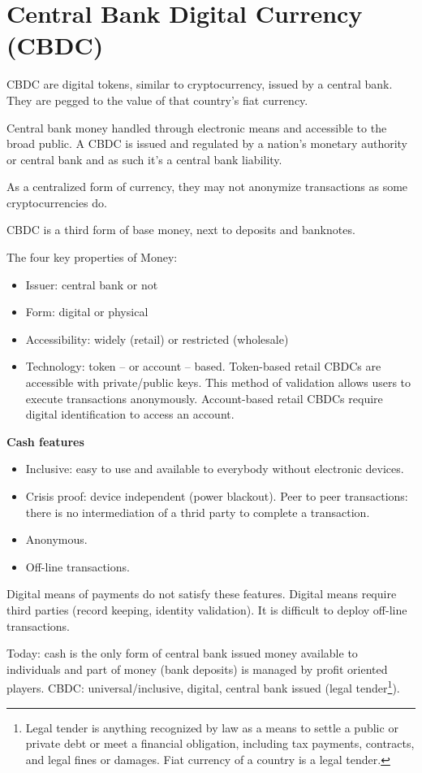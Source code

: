 \section{Central Bank Digital Currency (CBDC)}

CBDC are digital tokens, similar to cryptocurrency, issued by a central bank. They are pegged to the value of that country's fiat currency.

Central bank money handled through electronic means and accessible to the broad public. A CBDC is issued and regulated by a nation's monetary authority or central bank and as such it's a central bank liability.

As a centralized form of currency, they may not anonymize transactions as some cryptocurrencies do.

CBDC is a third form of base money, next to deposits and banknotes.

The four key properties of Money:
\begin{itemize}
    \item Issuer: central bank or not
    \item Form: digital or physical
    \item Accessibility: widely (retail) or restricted (wholesale)
    \item Technology: token -- or account -- based. Token-based retail CBDCs are accessible with private/public keys. This method of validation allows users to execute transactions anonymously. Account-based retail CBDCs require digital identification to access an account.
\end{itemize}

\textbf{Cash features}
\begin{itemize}
    \item Inclusive: easy to use and available to everybody without electronic devices.
    \item Crisis proof: device independent (power blackout).
    Peer to peer transactions: there is no intermediation of a thrid party to complete a transaction.
    \item Anonymous.
    \item Off-line transactions.
\end{itemize}

Digital means of payments do not satisfy these features. Digital means require third parties (record keeping, identity validation). It is difficult to deploy off-line transactions.

Today: cash is the only form of central bank issued money available to individuals and part of money (bank deposits) is managed by profit oriented players.
CBDC: universal/inclusive, digital, central bank issued (legal tender\footnote{Legal tender is anything recognized by law as a means to settle a public or private debt or meet a financial obligation, including tax payments, contracts, and legal fines or damages. Fiat currency of a country is a legal tender.}).

